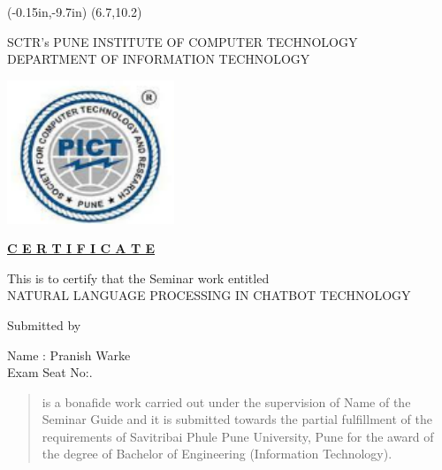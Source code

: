 \documentclass[12pt,a4paper]{report}     %
\begin{document}
	\thisfancyput(-0.15in,-9.7in){%
\setlength{\unitlength}{1in}\framebox(6.7,10.2)}
\begin{center}

{ SCTR's
   PUNE INSTITUTE OF COMPUTER TECHNOLOGY \\
   \small{DEPARTMENT OF INFORMATION TECHNOLOGY} \\

}
\vspace{0.2in}

\vspace{0.2in}
\includegraphics[width=5cm]{pict_logo.png}
\end{center}
\vspace{0.4in}
\begin{center}
\textbf{\underline{C E R T I F I C A T E}}
\vspace{0.2in}
\end{center}
		\noindent
  				\setlength{\baselineskip}{1.1\baselineskip}
	\begin{center}
This is to certify that the Seminar work entitled \\
		{NATURAL LANGUAGE PROCESSING IN CHATBOT TECHNOLOGY } 
\begin{center} {Submitted by }\end{center}

Name : Pranish Warke\\   %
Exam Seat No:\hspace{0.4in}.%
	\end{center}
\onehalfspace
\begin{quote}
is a bonafide work carried out under the supervision of   {Name of the  Seminar Guide}  and it is submitted towards the partial fulfillment of the requirements of Savitribai Phule Pune University, Pune for the award of the degree of Bachelor of Engineering (Information Technology).
\end{quote}
		\noindent 
		\vspace{0.2 in}
\end{document}

